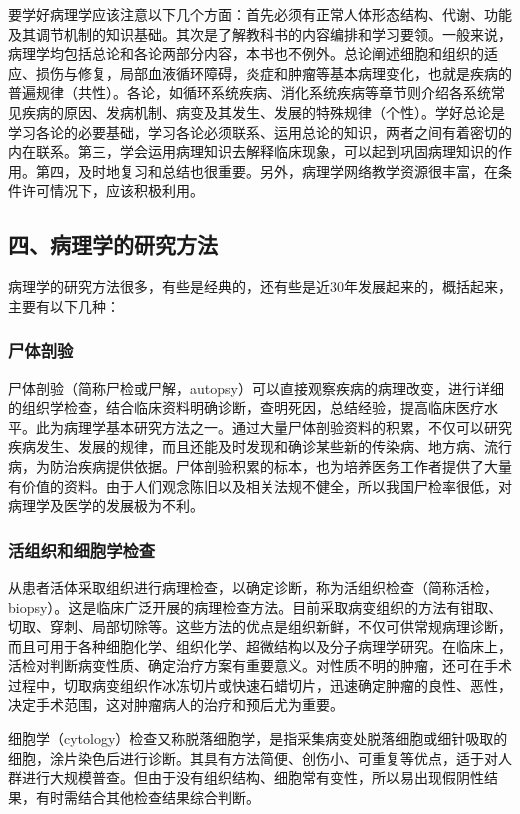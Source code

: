 要学好病理学应该注意以下几个方面：首先必须有正常人体形态结构、代谢、功能及其调节机制的知识基础。其次是了解教科书的内容编排和学习要领。一般来说，病理学均包括总论和各论两部分内容，本书也不例外。总论阐述细胞和组织的适应、损伤与修复，局部血液循环障碍，炎症和肿瘤等基本病理变化，也就是疾病的普遍规律（共性）。各论，如循环系统疾病、消化系统疾病等章节则介绍各系统常见疾病的原因、发病机制、病变及其发生、发展的特殊规律（个性）。学好总论是学习各论的必要基础，学习各论必须联系、运用总论的知识，两者之间有着密切的内在联系。第三，学会运用病理知识去解释临床现象，可以起到巩固病理知识的作用。第四，及时地复习和总结也很重要。另外，病理学网络教学资源很丰富，在条件许可情况下，应该积极利用。

\subsection*{四、病理学的研究方法}

病理学的研究方法很多，有些是经典的，还有些是近30年发展起来的，概括起来，主要有以下几种：

\subsubsection*{尸体剖验}

尸体剖验（简称尸检或尸解，autopsy）可以直接观察疾病的病理改变，进行详细的组织学检查，结合临床资料明确诊断，查明死因，总结经验，提高临床医疗水平。此为病理学基本研究方法之一。通过大量尸体剖验资料的积累，不仅可以研究疾病发生、发展的规律，而且还能及时发现和确诊某些新的传染病、地方病、流行病，为防治疾病提供依据。尸体剖验积累的标本，也为培养医务工作者提供了大量有价值的资料。由于人们观念陈旧以及相关法规不健全，所以我国尸检率很低，对病理学及医学的发展极为不利。

\subsubsection*{活组织和细胞学检查}

从患者活体采取组织进行病理检查，以确定诊断，称为活组织检查（简称活检，biopsy）。这是临床广泛开展的病理检查方法。目前采取病变组织的方法有钳取、切取、穿刺、局部切除等。这些方法的优点是组织新鲜，不仅可供常规病理诊断，而且可用于各种细胞化学、组织化学、超微结构以及分子病理学研究。在临床上，活检对判断病变性质、确定治疗方案有重要意义。对性质不明的肿瘤，还可在手术过程中，切取病变组织作冰冻切片或快速石蜡切片，迅速确定肿瘤的良性、恶性，决定手术范围，这对肿瘤病人的治疗和预后尤为重要。

细胞学（cytology）检查又称脱落细胞学，是指采集病变处脱落细胞或细针吸取的细胞，涂片染色后进行诊断。其具有方法简便、创伤小、可重复等优点，适于对人群进行大规模普查。但由于没有组织结构、细胞常有变性，所以易出现假阴性结果，有时需结合其他检查结果综合判断。

